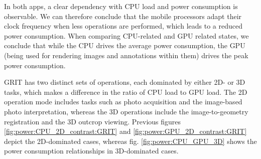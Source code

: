 \documentclass[review]{elsarticle}
\begin{document}

In both apps, a clear dependency with \gls{CPU} load and power consumption is observable. We can therefore conclude that the mobile processors adapt their clock frequency when less operations are performed, which leads to a reduced power consumption. When comparing \gls{CPU}-related and \gls{GPU} related states, we conclude that while the \gls{CPU} drives the average power consumption, the GPU (being used for rendering images and annotations within them) drives the peak power consumption.

\Gls{GRIT} has two distinct sets of operations, each dominated by either 2D- or 3D tasks, which makes a difference in the ratio of \gls{CPU} load to \gls{GPU} load. The 2D operation mode includes tasks such as photo acquisition and the image-based photo interpretation, whereas the 3D operations include the image-to-geometry registration \cite{Kehl2017_VGC} and the 3D outcrop viewing. Previous figures \ref{fig:power:CPU_2D_contrast:GRIT} and \ref{fig:power:GPU_2D_contrast:GRIT} depict the 2D-dominated cases, whereas fig. \ref{fig:power:CPU_GPU_3D} shows the power consumption relationships in 3D-dominated cases.
\end{document}
